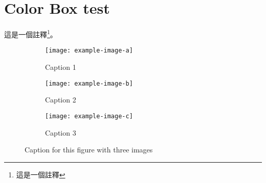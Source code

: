\documentclass[12pt]{article}
\begin{document}
\section{Color Box test}
\thm{}{}
這是一個註釋\footnote{這是一個註釋}。

\begin{figure}[H]
	\centering
	\begin{subfigure}{0.3\textwidth}
		\centering
		\texttt{[image: example-image-a]}
		\caption{Caption 1}
		\label{fig:sub1}
	\end{subfigure}
	\begin{subfigure}{0.3\textwidth}
		\centering
		\texttt{[image: example-image-b]}
		\caption{Caption 2}
		\label{fig:sub2}
	\end{subfigure}
	\begin{subfigure}{0.3\textwidth}
		\centering
		\texttt{[image: example-image-c]}
		\caption{Caption 3}
		\label{fig:sub3}
	\end{subfigure}
	\caption{Caption for this figure with three images}
	\label{fig:image3}
\end{figure}


\nocite{*}


\end{document}
